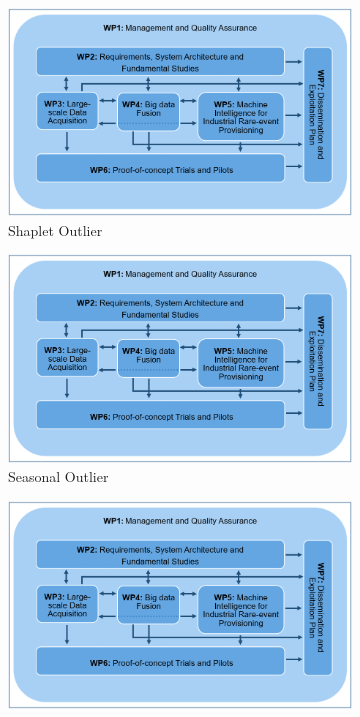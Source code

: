\begin{figure}[H]
     \centering
     \begin{subfigure}[b]{0.3\textwidth}
         \centering
         \includegraphics[width=\textwidth]{Images/FIREMAN_pert_diagram.png}
         \caption{Shaplet Outlier}
         \label{fig:shaplet}
     \end{subfigure}
     \hfill
     \begin{subfigure}[b]{0.3\textwidth}
         \centering
         \includegraphics[width=\textwidth]{Images/FIREMAN_pert_diagram.png}
         \caption{Seasonal Outlier}
         \label{fig:seasonal}
     \end{subfigure}
     \hfill
     \begin{subfigure}[b]{0.3\textwidth}
         \centering
         \includegraphics[width=\textwidth]{Images/FIREMAN_pert_diagram.png}

\end{subfigure}
\end{figure}
